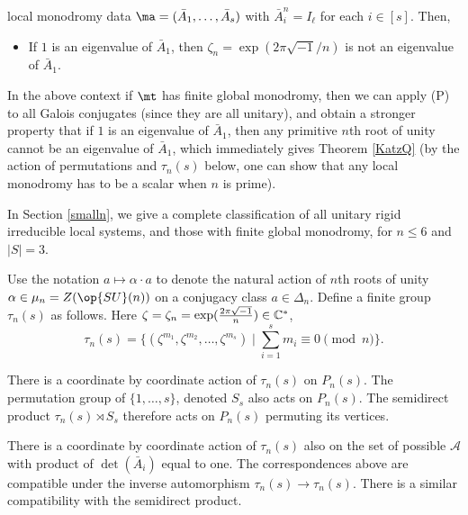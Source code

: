 local monodromy data $\ma=(\bar{A}_1,\dots,\bar{A}_s)$ with $\bar{A}_i^n=I_{\ell}$ for each $i\in[s]$.
Then,
\begin{itemize}
\item[(P)] If $1$ is an eigenvalue of $\bar{A}_1$, then $\zeta_n=\exp(2\pi\sqrt{-1}/n)$ is not an eigenvalue of $\bar{A}_1$.
\end{itemize}
In the above context if $\mt$ has finite global monodromy, then we can apply  (P) to all Galois conjugates (since they are all unitary), and obtain a stronger property that if  $1$ is an eigenvalue of $\bar{A}_1$, then any primitive $n$th root of unity cannot  be an eigenvalue of $\bar{A}_1$, which immediately gives
Theorem \ref{KatzQ} (by the action of permutations and $\tau_n(s)$  below, one can show that any local monodromy has to be a scalar when $n$ is prime).


In Section \ref{smalln}, we give a complete classification of all unitary rigid irreducible local systems, and those with finite global monodromy,  for $n\leq 6$ and $|S|=3$.

\begin{defi}
\notready\label{symmetry}
 Use the notation $a\mapsto \alpha\cdot a$ to denote the natural action of $n$th roots of unity $\alpha\in\mu_n=Z(\op{SU}(n))$ on a conjugacy class $a\in \Delta_n$. Define a finite group $\tau_n(s)$ as follows. Here $\zeta=\zeta_n=\exp(\frac{2\pi\sqrt{-1}}{n})\in \Bbb{C}^*$,
$$\tau_n(s)=\{(\zeta^{m_1},\zeta^{m_2},\dots,\zeta^{m_s})\mid \sum_{i=1}^s m_i\equiv 0 \pmod{n}\}.$$
\end{defi}
There is a coordinate by coordinate action of $\tau_n(s)$ on $P_n(s)$. The permutation group of $\{1,\dots,s\}$, denoted $S_s$ also acts on $P_n(s)$. The semidirect product $\tau_n(s)\rtimes S_s$ therefore acts on $P_n(s)$ permuting its vertices.

There is a coordinate by coordinate action of $\tau_n(s)$ also on the set of possible $\mathcal{A}$ with product of $\det(\bar{A}_i)$ equal to one. The correspondences above are compatible under the inverse automorphism $\tau_n(s)\to \tau_n(s)$. There is a similar compatibility  with the semidirect product.
